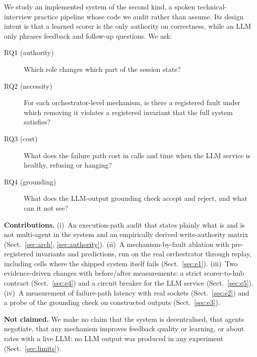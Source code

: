 \documentclass[runningheads]{llncs}
\begin{document}
We study an implemented system of the second kind, a spoken technical-interview practice pipeline whose code we audit rather than assume. Its design intent is that a learned scorer is the only authority on correctness, while an LLM only phrases feedback and follow-up questions. We ask:

\begin{description}
\item[RQ1 (authority)] Which role changes which part of the session state?
\item[RQ2 (necessity)] For each orchestrator-level mechanism, is there a registered fault under which removing it violates a registered invariant that the full system satisfies?
\item[RQ3 (cost)] What does the failure path cost in calls and time when the LLM service is healthy, refusing or hanging?
\item[RQ4 (grounding)] What does the LLM-output grounding check accept and reject, and what can it not see?
\end{description}

\noindent\textbf{Contributions.} (i)~An execution-path audit that states plainly what is and is not multi-agent in the system and an empirically derived write-authority matrix (Sect.~\ref{sec:arch}, \ref{sec:authority}). (ii)~A mechanism-by-fault ablation with pre-registered invariants and predictions, run on the real orchestrator through replay, including cells where the shipped system itself fails (Sect.~\ref{sec:e1}). (iii)~Two evidence-driven changes with before/after measurements: a strict scorer-to-hub contract (Sect.~\ref{sec:e4}) and a circuit breaker for the LLM service (Sect.~\ref{sec:e5}). (iv)~A measurement of failure-path latency with real sockets (Sect.~\ref{sec:e2}) and a probe of the grounding check on constructed outputs (Sect.~\ref{sec:e3}).

\noindent\textbf{Not claimed.} We make no claim that the system is decentralised, that agents negotiate, that any mechanism improves feedback quality or learning, or about rates with a live LLM: no LLM output was produced in any experiment (Sect.~\ref{sec:limits}).
\end{document}
